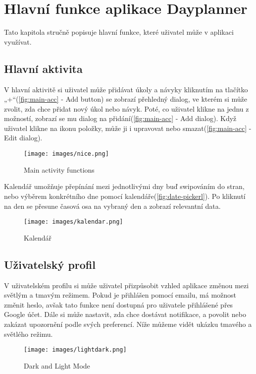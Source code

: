 \chapter{Hlavní funkce aplikace Dayplanner}  
\hspace{14pt} Tato kapitola stručně popisuje hlavní funkce, které uživatel může v aplikaci využívat.  

\section{Hlavní aktivita}  
\hspace{14pt} V hlavní aktivitě si uživatel může přidávat úkoly a návyky kliknutím na tlačítko „+“(\autoref{fig:main-acc} - Add button) se zobrazí přehledný dialog, ve kterém si může zvolit, zda chce přidat nový úkol nebo návyk. Poté, co uživatel klikne na jednu z možností, zobrazí se mu dialog na přidání(\autoref{fig:main-acc} - Add dialog). Když uživatel klikne na ikonu položky, může ji i upravovat nebo smazat(\autoref{fig:main-acc} - Edit dialog).

\begin{figure}[H]
    \centering
    \texttt{[image: images/nice.png]}
    \caption{Main activity functions}
    \label{fig:main-acc}
\end{figure}

\newpage

Kalendář umožňuje přepínání mezi jednotlivými dny buď swipováním do stran, nebo výběrem konkrétního dne pomocí kalendáře(\autoref{fig:date-pickerl}). Po kliknutí na den se přesune časová osa na vybraný den a zobrazí relevantní data.  
\begin{figure}[H]
    \centering
    \texttt{[image: images/kalendar.png]}
    \caption{Kalendář}
    \label{fig:date-pickerl}
\end{figure}

\newpage

\section{Uživatelský profil}  
\hspace{14pt} V uživatelském profilu si může uživatel přizpůsobit vzhled aplikace změnou mezi světlým a tmavým režimem. Pokud je přihlášen pomocí emailu, má možnost změnit heslo, avšak tato funkce není dostupná pro uživatele přihlášené přes Google účet. Dále si může nastavit, zda chce dostávat notifikace, a povolit nebo zakázat upozornění podle svých preferencí. Níže můžeme vidět ukázku tmavého a světlého režimu.

\begin{figure}[H]
    \centering
    \texttt{[image: images/lightdark.png]}
    \caption{Dark and Light Mode}
    \label{fig:enter-label}
\end{figure}
\newpage

